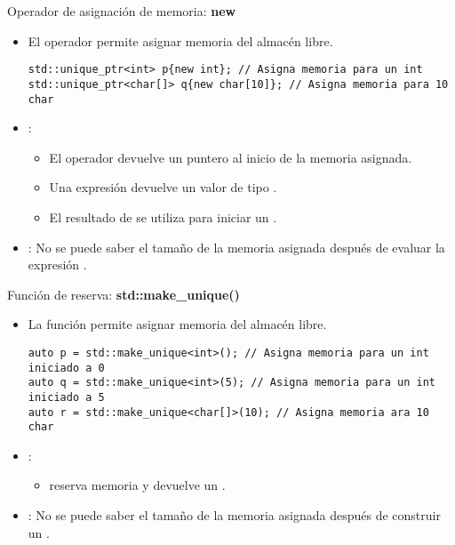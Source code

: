 \begin{frame}[t,fragile]{Operador de asignación de memoria: \textbf{new}}
\begin{itemize}
  \item El operador  permite asignar memoria del almacén libre.
\begin{lstlisting}
std::unique_ptr<int> p{new int}; // Asigna memoria para un int
std::unique_ptr<char[]> q{new char[10]}; // Asigna memoria para 10 char
\end{lstlisting}

  \item {}:
    \begin{itemize}
      \item El operador  devuelve un puntero al inicio de la memoria asignada.
      \item Una expresión   devuelve un valor de tipo .
      \item El resultado de  se utiliza para iniciar un .
    \end{itemize}

  \item {}: No se puede saber el tamaño de la memoria asignada 
        después de evaluar la expresión .
\end{itemize}
\end{frame}

\begin{frame}[t,fragile]{Función de reserva: \textbf{std::make\_unique()}}
\begin{itemize}
  \item La función  permite asignar memoria del 
        almacén libre.
\begin{lstlisting}
auto p = std::make_unique<int>(); // Asigna memoria para un int iniciado a 0
auto q = std::make_unique<int>(5); // Asigna memoria para un int iniciado a 5
auto r = std::make_unique<char[]>(10); // Asigna memoria ara 10 char
\end{lstlisting}

  \item {}:
    \begin{itemize}
      \item {} reserva memoria y devuelve 
            un .
    \end{itemize}

  \item {}: No se puede saber el tamaño de la memoria asignada 
        después de construir un .
\end{itemize}
\end{frame}

